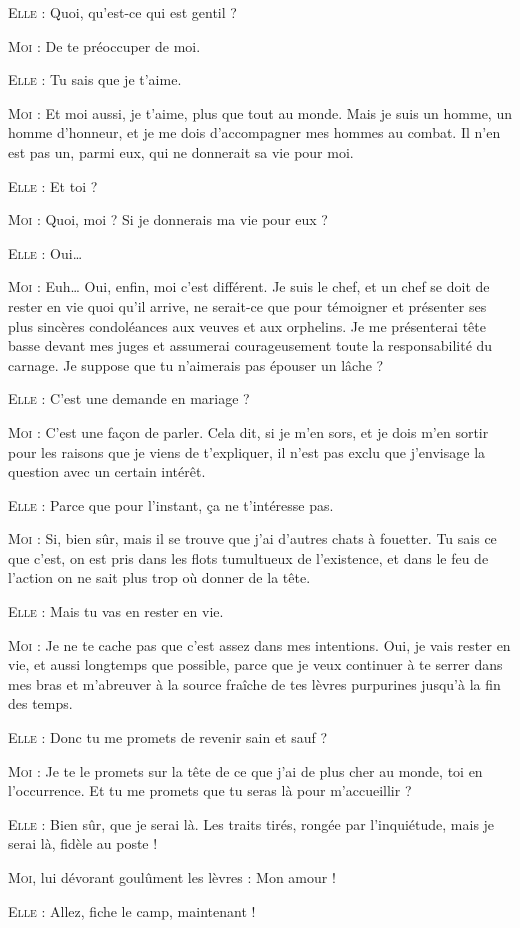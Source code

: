 \begin{dialogue}
\textsc{Elle} : Quoi, qu’est-ce qui est gentil ?

\textsc{Moi} : De te préoccuper de moi.

\textsc{Elle} : Tu sais que je t’aime.

\textsc{Moi} : Et moi aussi, je t’aime, plus que tout au monde. Mais je suis un homme, un homme d’honneur, et je me dois d’accompagner mes hommes au combat. Il n’en est pas un, parmi eux, qui ne donnerait sa vie pour moi.

\textsc{Elle} : Et toi ?

\textsc{Moi} : Quoi, moi ? Si je donnerais ma vie pour eux ?

\textsc{Elle} : Oui…

\textsc{Moi} : Euh… Oui, enfin, moi c’est différent. Je suis le chef, et un chef se doit de rester en vie quoi qu’il arrive, ne serait-ce que pour témoigner et présenter ses plus sincères condoléances aux veuves et aux orphelins. Je me présenterai tête basse devant mes juges et assumerai courageusement toute la responsabilité du carnage. Je suppose que tu n’aimerais pas épouser un lâche ?

\textsc{Elle} : C’est une demande en mariage ?

\textsc{Moi} : C’est une façon de parler. Cela dit, si je m’en sors, et je dois m’en sortir pour les raisons que je viens de t’expliquer, il n’est pas exclu que j’envisage la question avec un certain intérêt.

\textsc{Elle} : Parce que pour l’instant, ça ne t’intéresse pas.

\textsc{Moi} : Si, bien sûr, mais il se trouve que j’ai d’autres chats à fouetter. Tu sais ce que c’est, on est pris dans les flots tumultueux de l’existence, et dans le feu de l’action on ne sait plus trop où donner de la tête.

\textsc{Elle} : Mais tu vas en rester en vie.

\textsc{Moi} : Je ne te cache pas que c’est assez dans mes intentions. Oui, je vais rester en vie, et aussi longtemps que possible, parce que je veux continuer à te serrer dans mes bras et m’abreuver à la source fraîche de tes lèvres purpurines jusqu’à la fin des temps.

\textsc{Elle} : Donc tu me promets de revenir sain et sauf ?

\textsc{Moi} : Je te le promets sur la tête de ce que j’ai de plus cher au monde, toi en l’occurrence. Et tu me promets que tu seras là pour m’accueillir ?

\textsc{Elle} : Bien sûr, que je serai là. Les traits tirés, rongée par l’inquiétude, mais je serai là, fidèle au poste !

\textsc{Moi}, lui dévorant goulûment les lèvres : Mon amour !

\textsc{Elle} : Allez, fiche le camp, maintenant !

\end{dialogue}

